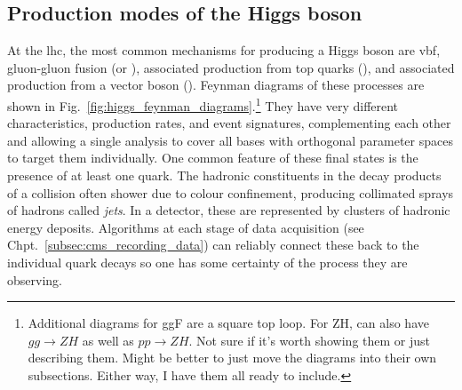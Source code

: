 

\subsection{Production modes of the Higgs boson}
\label{subsec:theory_higgs_production_modes}

At the \acrshort{lhc}, the most common mechanisms for producing a Higgs boson are \acrfull{vbf}, gluon-gluon fusion (\ggF or \ggH), associated production from top quarks (\ttH), and associated production from a vector boson (\VH). Feynman diagrams of these processes are shown in Fig.~\ref{fig:higgs_feynman_diagrams}.\footnote{Additional diagrams for ggF are a square top loop. For ZH, can also have $gg\to ZH$ as well as $pp\to ZH$. Not sure if it's worth showing them or just describing them. Might be better to just move the diagrams into their own subsections. Either way, I have them all ready to include.} They have very different characteristics, production rates, and event signatures, complementing each other and allowing a single analysis to cover all bases with orthogonal parameter spaces to target them individually. One common feature of these final states is the presence of at least one quark. The hadronic constituents in the decay products of a collision often shower due to colour confinement, producing collimated sprays of hadrons called \emph{\glspl{jet}}. In a detector, these are represented by clusters of hadronic energy deposits. Algorithms at each stage of data acquisition (see Chpt.~\ref{subsec:cms_recording_data}) can reliably connect these back to the individual quark decays so one has some certainty of the process they are observing.


